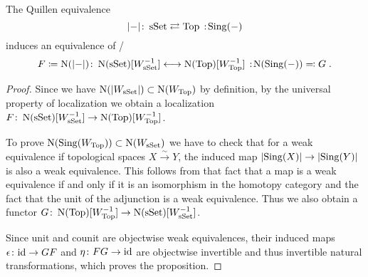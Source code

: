 \begin{prop}\label{prop:homotopyHypothesis}
    The Quillen equivalence 
    \begin{equation*}
        \lvert-\rvert\colon\sSet\rightleftarrows\Top\mkern+3mu:\mkern-3mu\Sing(-)
    \end{equation*}
    induces an equivalence of \inftycats/ 
    \begin{equation*}
        F\coloneqq\N(\lvert-\rvert)\colon \N(\sSet)\lbrack W_{\sSet}^{-1}\rbrack\longleftrightarrow\N(\Top)\lbrack W_{\Top}^{-1}\rbrack\mkern+3mu:\mkern-3mu\N(\Sing(-))\eqqcolon G\;.
    \end{equation*}
    \begin{proof}%
        Since we have $\operatorname{N}(\lvert W_{\operatorname{sSet}}\rvert)\subset \operatorname{N}(W_{\operatorname{Top}})$ by definition, by the universal property of localization we obtain a localization $F\colon \operatorname{N}(\operatorname{sSet})\lbrack W_{\operatorname{sSet}}^{-1}\rbrack\to\operatorname{N}(\operatorname{Top})\lbrack W_{\operatorname{Top}}^{-1}\rbrack$.

        To prove $\operatorname{N}(\operatorname{Sing}(W_{\operatorname{Top}}))\subset\operatorname{N}(W_{\operatorname{sSet}})$ we have to check that for a weak equivalence if topological spaces $X\xrightarrow{\sim} Y$, the induced map $\lvert\operatorname{Sing}(X)\rvert\to \lvert\operatorname{Sing}(Y)\rvert$ is also a weak equivalence.
        This follows from that fact that a map is a weak equivalence if and only if it is an isomorphism in the homotopy category and the fact that the unit of the adjunction is a weak equivalence.
        Thus we also obtain a functor $G\colon\operatorname{N}(\operatorname{Top})\lbrack W_{\operatorname{Top}}^{-1}\rbrack\to\operatorname{N}(\operatorname{sSet})\lbrack W_{\operatorname{sSet}}^{-1}\rbrack$.

        Since unit and counit are objectwise weak equivalences, their induced maps $\epsilon\colon\text{id}\to GF$ and $\eta\colon FG\to \text{id}$ are objectwise invertible and thus invertible natural transformations, which proves the proposition. %
    \end{proof}
\end{prop}

